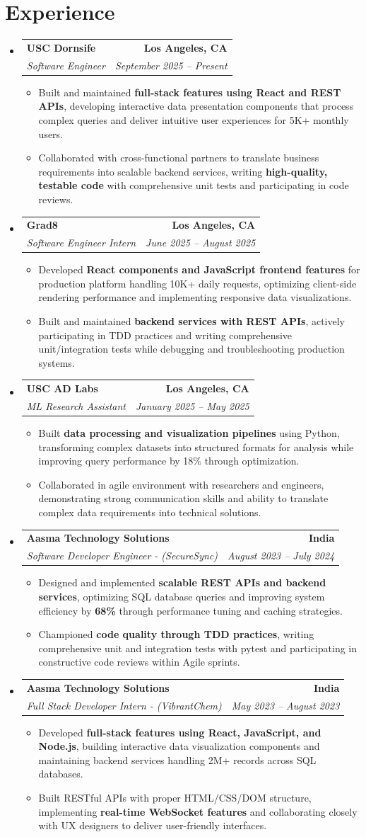 \documentclass[letterpaper,10pt]{article}
\makeatletter
\newcommand{\resumeItem}[1]{\item\small{{#1 \vspace{-2pt}}}}
\newcommand{\resumeSubheading}[4]{\vspace{-1pt}\item\begin{tabular*}{1.0\textwidth}[t]{l@{\extracolsep{\fill}}r}\textbf{#1} & \textbf{\small #2} \\\textit{\small#3} & \textit{\small #4} \\\end{tabular*}\vspace{-2pt}}
\newcommand{\resumeSubHeadingListStart}{\begin{itemize}[leftmargin=0.0in, label={}]}
\newcommand{\resumeSubHeadingListEnd}{\end{itemize}}
\newcommand{\resumeItemListStart}{\begin{itemize}[leftmargin=0.15in,label=\textbullet,itemsep=2pt,topsep=0pt,parsep=0pt,partopsep=0pt]}
\newcommand{\resumeItemListEnd}{\end{itemize}\vspace{-4pt}}
\makeatother
\begin{document}
\section{Experience}
\resumeSubHeadingListStart
\resumeSubheading{USC Dornsife}{Los Angeles, CA}{Software Engineer}{September 2025 -- Present}
\resumeItemListStart
\resumeItem{Built and maintained \textbf{full-stack features using React and REST APIs}, developing interactive data presentation components that process complex queries and deliver intuitive user experiences for 5K+ monthly users.}
\resumeItem{Collaborated with cross-functional partners to translate business requirements into scalable backend services, writing \textbf{high-quality, testable code} with comprehensive unit tests and participating in code reviews.}
\resumeItemListEnd
\resumeSubheading{Grad8}{Los Angeles, CA}{Software Engineer Intern}{June 2025 -- August 2025}
\resumeItemListStart
\resumeItem{Developed \textbf{React components and JavaScript frontend features} for production platform handling 10K+ daily requests, optimizing client-side rendering performance and implementing responsive data visualizations.}
\resumeItem{Built and maintained \textbf{backend services with REST APIs}, actively participating in TDD practices and writing comprehensive unit/integration tests while debugging and troubleshooting production systems.}
\resumeItemListEnd
\resumeSubheading{USC AD Labs}{Los Angeles, CA}{ML Research Assistant}{January 2025 -- May 2025}
\resumeItemListStart
\resumeItem{Built \textbf{data processing and visualization pipelines} using Python, transforming complex datasets into structured formats for analysis while improving query performance by 18\% through optimization.}
\resumeItem{Collaborated in agile environment with researchers and engineers, demonstrating strong communication skills and ability to translate complex data requirements into technical solutions.}
\resumeItemListEnd
\resumeSubheading{Aasma Technology Solutions}{India}{Software Developer Engineer - (SecureSync)}{August 2023 -- July 2024}
\resumeItemListStart
\resumeItem{Designed and implemented \textbf{scalable REST APIs and backend services}, optimizing SQL database queries and improving system efficiency by \textbf{68\%} through performance tuning and caching strategies.}
\resumeItem{Championed \textbf{code quality through TDD practices}, writing comprehensive unit and integration tests with pytest and participating in constructive code reviews within Agile sprints.}
\resumeItemListEnd
\resumeSubheading{Aasma Technology Solutions}{India}{Full Stack Developer Intern - (VibrantChem)}{May 2023 -- August 2023}
\resumeItemListStart
\resumeItem{Developed \textbf{full-stack features using React, JavaScript, and Node.js}, building interactive data visualization components and maintaining backend services handling 2M+ records across SQL databases.}
\resumeItem{Built RESTful APIs with proper HTML/CSS/DOM structure, implementing \textbf{real-time WebSocket features} and collaborating closely with UX designers to deliver user-friendly interfaces.}
\resumeItemListEnd
\resumeSubHeadingListEnd
\vspace{-14pt}
\end{document}
